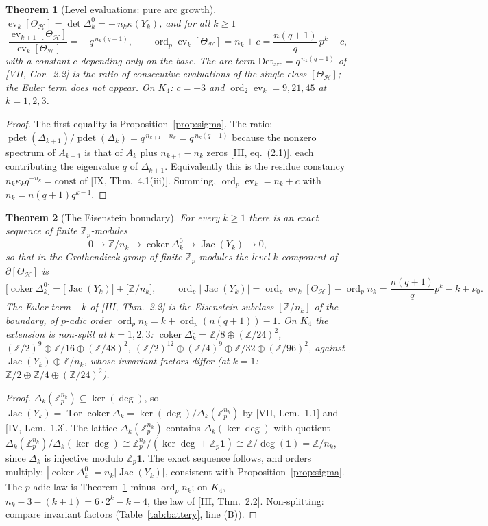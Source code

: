 \documentclass[11pt]{amsart}
\numberwithin{equation}{section}
\newtheorem{theorem}{Theorem}[section]
\theoremstyle{definition}
\theoremstyle{remark}
\newcommand{\Z}{\mathbb{Z}}
\newcommand{\Zp}{\Z_p}
\newcommand{\cH}{\mathcal{H}}
\newcommand{\Jac}{\operatorname{Jac}}
\newcommand{\coker}{\operatorname{coker}}
\newcommand{\Tor}{\operatorname{Tor}}
\newcommand{\ord}{\operatorname{ord}}
\newcommand{\pdet}{\operatorname{pdet}}
\newcommand{\ev}{\operatorname{ev}}
\begin{document}
\begin{theorem}[Level evaluations: pure arc growth]\label{thm:eval}
$\ev_k[\Theta_{\cH}]=\det\Delta_k^{0}=\pm\,n_k\kappa(Y_k)$, and for all $k\ge1$
\[
\frac{\ev_{k+1}[\Theta_{\cH}]}{\ev_k[\Theta_{\cH}]}=\pm\,q^{\,n_k(q-1)},\qquad
\ord_p\ev_k[\Theta_{\cH}]=n_k+c=\frac{n(q{+}1)}{q}\,p^{k}+c ,
\]
with a constant $c$ depending only on the base. The arc term $\mathrm{Det_{arc}}=q^{\,n_k(q-1)}$
of {\rm[VII, Cor.~2.2]} is the ratio of consecutive evaluations of the single class
$[\Theta_{\cH}]$; the Euler term does not appear. On $K_4$: $c=-3$ and
$\ord_2\ev_k=9,21,45$ at $k=1,2,3$.
\end{theorem}

\begin{proof}
The first equality is Proposition~\ref{prop:sigma}. The ratio: $\pdet(\Delta_{k+1})/\pdet(\Delta_k)
=q^{\,n_{k+1}-n_k}=q^{\,n_k(q-1)}$ because the nonzero spectrum of $A_{k+1}$ is that of $A_k$
plus $n_{k+1}-n_k$ zeros [III, eq.~(2.1)], each contributing the eigenvalue $q$ of
$\Delta_{k+1}$. Equivalently this is the residue constancy $n_k\kappa_kq^{-n_k}=\mathrm{const}$
of [IX, Thm.~4.1(iii)]. Summing, $\ord_p\ev_k=n_k+c$ with $n_k=n(q{+}1)q^{k-1}$.
\end{proof}

\begin{theorem}[The Eisenstein boundary]\label{thm:boundary}
For every $k\ge1$ there is an exact sequence of finite $\Zp$-modules
\[
0\longrightarrow\Z/n_k\longrightarrow\coker\Delta_k^{0}\longrightarrow\Jac(Y_k)\longrightarrow0,
\]
so that in the Grothendieck group of finite $\Zp$-modules the level-$k$ component of
$\partial[\Theta_{\cH}]$ is
\[
\bigl[\coker\Delta_k^{0}\bigr]=\bigl[\Jac(Y_k)\bigr]+\bigl[\Z/n_k\bigr],
\qquad
\ord_p|\Jac(Y_k)|=\ord_p\ev_k[\Theta_{\cH}]-\ord_pn_k=\frac{n(q{+}1)}{q}p^{k}-k+\nu_0 .
\]
The Euler term $-k$ of {\rm[III, Thm.~2.2]} is the Eisenstein subclass $[\Z/n_k]$ of the
boundary, of $p$-adic order $\ord_pn_k=k+\ord_p(n(q{+}1))-1$. On $K_4$ the extension is
non-split at $k=1,2,3$: $\coker\Delta_k^{0}=\Z/8\oplus(\Z/24)^{2}$,
$(\Z/2)^{9}\oplus\Z/16\oplus(\Z/48)^{2}$, $(\Z/2)^{12}\oplus(\Z/4)^{9}\oplus\Z/32\oplus(\Z/96)^{2}$,
against $\Jac(Y_k)\oplus\Z/n_k$, whose invariant factors differ (at $k=1$:
$\Z/2\oplus\Z/4\oplus(\Z/24)^{2}$).
\end{theorem}

\begin{proof}
$\Delta_k(\Zp^{n_k})\subseteq\ker(\deg)$, so $\Jac(Y_k)=\Tor\coker\Delta_k=\ker(\deg)/\Delta_k
(\Zp^{n_k})$ by [VII, Lem.~1.1] and [IV, Lem.~1.3]. The lattice $\Delta_k(\Zp^{n_k})$ contains
$\Delta_k(\ker\deg)$ with quotient $\Delta_k(\Zp^{n_k})/\Delta_k(\ker\deg)\cong\Zp^{n_k}/
(\ker\deg+\Zp\mathbf1)\cong\Z/\deg(\mathbf1)=\Z/n_k$, since $\Delta_k$ is injective modulo
$\Zp\mathbf1$. The exact sequence follows, and orders multiply: $|\coker\Delta_k^{0}|=n_k
|\Jac(Y_k)|$, consistent with Proposition~\ref{prop:sigma}. The $p$-adic law is
Theorem~\ref{thm:eval} minus $\ord_pn_k$; on $K_4$, $n_k-3-(k+1)=6\cdot2^{k}-k-4$, the law of
[III, Thm.~2.2]. Non-splitting: compare invariant factors (Table~\ref{tab:battery}, line (B)).
\end{proof}
\end{document}
